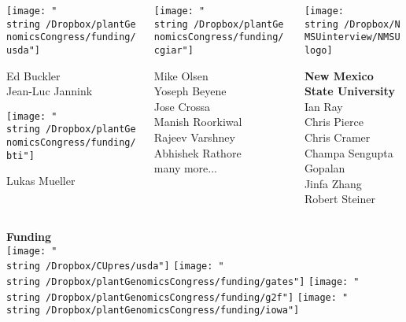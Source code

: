 \documentclass[11pt, aspectratio=169]{beamer}
\begin{document}
{\begin{columns}
\begin{column}{0.2\linewidth}
\texttt{[image: "\\string~/Dropbox/plantGenomicsCongress/funding/usda"]}

\scriptsize 
Ed Buckler \\
Jean-Luc Jannink \\

\vspace{0.5cm}

\texttt{[image: "\\string~/Dropbox/plantGenomicsCongress/funding/bti"]}

\scriptsize 
Lukas Mueller \\

\end{column}


\begin{column}{0.2\linewidth}


\texttt{[image: "\\string~/Dropbox/plantGenomicsCongress/funding/cgiar"]}

\scriptsize 
Mike Olsen \\
Yoseph Beyene \\
Jose Crossa \\
Manish Roorkiwal \\
Rajeev Varshney \\
Abhishek Rathore \\
many more...
\end{column}

\begin{column}{0.2\linewidth}


\texttt{[image: \\string~/Dropbox/NMSUinterview/NMSUlogo]}

\normalsize {\textbf{New Mexico State University}}
\scriptsize 
Ian Ray\\
Chris Pierce\\
Chris Cramer\\
Champa Sengupta Gopalan\\
Jinfa Zhang\\
Robert Steiner\\
\end{column}

\end{columns}

\textbf{Funding}\\
\texttt{[image: "\\string~/Dropbox/CUpres/usda"]} \hspace{0.5cm}
\texttt{[image: "\\string~/Dropbox/plantGenomicsCongress/funding/gates"]} \hspace{0.5cm}
\texttt{[image: "\\string~/Dropbox/plantGenomicsCongress/funding/g2f"]} \hspace{0.5cm}
\texttt{[image: "\\string~/Dropbox/plantGenomicsCongress/funding/iowa"]}


}
\end{document}
